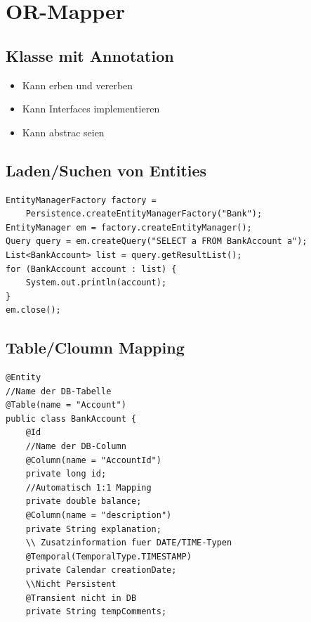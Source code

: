 \section{OR-Mapper}

    \subsection{Klasse mit Annotation \@Entity}
        \begin{itemize}
          \setlength{\itemsep}{0pt}
          \item Kann erben und vererben
          \item Kann Interfaces implementieren
          \item Kann abstrac seien
        \end{itemize}
    \begin{multicols}{2}   
    \subsection{Laden/Suchen von Entities}
    
\begin{lstlisting}[style=Java] 
EntityManagerFactory factory =
    Persistence.createEntityManagerFactory("Bank");
EntityManager em = factory.createEntityManager();
Query query = em.createQuery("SELECT a FROM BankAccount a");
List<BankAccount> list = query.getResultList();
for (BankAccount account : list) {
    System.out.println(account);
}
em.close();
\end{lstlisting}
    
    \subsection{Table/Cloumn Mapping}
        
\begin{lstlisting}[style=Java]
@Entity
//Name der DB-Tabelle
@Table(name = "Account") 
public class BankAccount {
    @Id
    //Name der DB-Column
    @Column(name = "AccountId")
    private long id;
    //Automatisch 1:1 Mapping
    private double balance;
    @Column(name = "description")
    private String explanation;
    \\ Zusatzinformation fuer DATE/TIME-Typen
    @Temporal(TemporalType.TIMESTAMP)
    private Calendar creationDate;
    \\Nicht Persistent
    @Transient nicht in DB
    private String tempComments;
\end{lstlisting}
        

\end{multicols}
